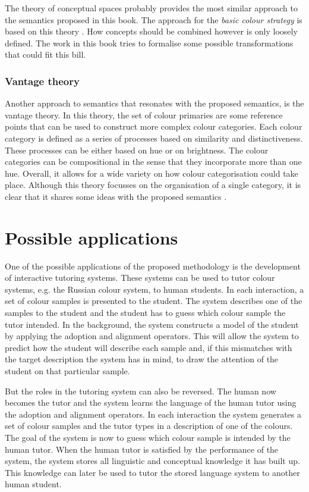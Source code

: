 The theory of conceptual spaces probably provides the most similar
approach to the semantics proposed in this book. The approach for
the \emph{basic colour strategy} is based on this theory
\citep{gardenfors04conceptual}. How concepts should be combined
however is only loosely defined. The work in this book tries to
formalise some possible transformations that could fit this bill.

\subsubsection*{Vantage theory}

Another approach to semantics that resonates with the proposed
semantics, is the vantage theory. In this theory, the set of colour
primaries are some reference points that can be used to construct more
complex colour categories. Each colour category is defined as a series
of processes based on similarity and distinctiveness. These processes
can be either based on hue or on brightness. The colour categories can
be compositional in the sense that they incorporate more than one
hue. Overall, it allows for a wide variety on how colour
categorisation could take place. Although this theory focusses on the
organisation of a single category, it is clear that it shares some
ideas with the proposed semantics \citep{maclaury92brightness,
  maclaury02introducing}.

\section{Possible applications}
\label{s:possible-applications}

One of the possible applications of the proposed methodology is the
development of interactive tutoring systems. These systems can be used
to tutor colour systems, e.g. the Russian colour system,
to human students. In each interaction, a set of colour samples is
presented to the student. The system describes one of the samples to
the student and the student has to guess which colour sample the tutor
intended. In the background, the system constructs a model of the
student by applying the adoption and alignment operators. This will
allow the system to predict how the student will describe each sample
and, if this mismatches with the target description the system has in
mind, to draw the attention of the student on that particular sample.

But the roles in the tutoring system can also be reversed. The human
now becomes the tutor and the system learns the language of the human
tutor using the adoption and alignment operators. In each interaction
the system generates a set of colour samples and the tutor types in a
description of one of the colours. The goal of the system is now to
guess which colour sample is intended by the human tutor. When the
human tutor is satisfied by the performance of the system, the system
stores all linguistic and conceptual knowledge it has built up. This
knowledge can later be used to tutor the stored language system to
another human student.

